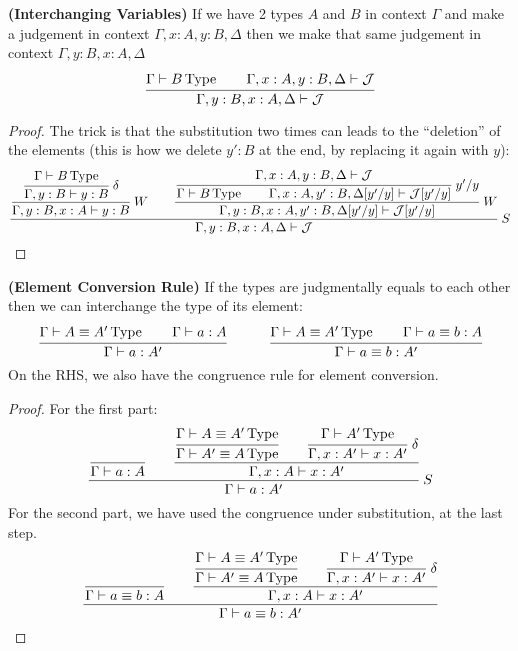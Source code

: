 \begin{lemma}{\textbf{(Interchanging Variables)}}
    If we have 2 types $A$ and $B$ in context $\Gamma$ and make a judgement in context $\Gamma,x:A,y:B,\Delta$ then we make that same judgement in context $\Gamma,y:B,x:A,\Delta$
    \begin{equation*}
        \cfrac{\Gamma\vdash B\operatorname{Type}  \qquad \Gamma,x:A,y:B,\Delta\vdash\mathcal{J}}{\Gamma,y:B,x:A,\Delta\vdash\mathcal{J}}
    \end{equation*}
\end{lemma}

\begin{proof}
    The trick is that the substitution two times can leads to the ``deletion'' of the elements (this is how we delete $y':B$ at the end, by replacing it again with $y$):
    \begin{equation*}
        \cfrac{\cfrac{\cfrac{\Gamma\vdash B\type }{\Gamma,y:B\vdash y:B}\ \delta}{\Gamma,y:B,x:A\vdash y:B} \ W \qquad\cfrac{\cfrac{\Gamma,x:A,y:B,\Delta\vdash\mathcal{J}}{\Gamma\vdash B\type \qquad\Gamma,x:A,y':B,\Delta[y'/y]\vdash\mathcal{J}[y'/y]}\ y'/y}{\Gamma,y:B,x:A,y':B,\Delta[y'/y]\vdash\mathcal{J}[y'/y]} \ W}{\Gamma,y:B,x:A,\Delta\vdash\mathcal{J}} \ S
    \end{equation*}
\end{proof}


\begin{lemma}{\textbf{(Element Conversion Rule)}}
    \label{lemma:element-conv-rule}
    If the types are judgmentally equals to each other then we can interchange the type of its element:
    \begin{equation*}
        \cfrac{\Gamma\vdash A\equiv A'\operatorname{Type} \qquad\Gamma\vdash a:A}{\Gamma\vdash a:A'} \qquad \quad \cfrac{\Gamma\vdash A\equiv A'\operatorname{Type}\qquad \Gamma\vdash a\equiv b:A}{\Gamma\vdash a\equiv b:A'}
    \end{equation*}
    On the RHS, we also have the congruence rule for element conversion.
\end{lemma}

\begin{proof}
    For the first part:
    \begin{equation*}
        \cfrac{\cfrac{}{\Gamma\vdash a:A}  \qquad \cfrac{\cfrac{\Gamma\vdash A\equiv A'\type }{\Gamma\vdash A'\equiv A\type }\qquad \cfrac{\Gamma\vdash A'\type }{\Gamma, x:A'\vdash x:A'}\ \delta}{\Gamma, x:A\vdash x:A'}}{\Gamma\vdash a:A'} \ S
    \end{equation*}
    For the second part, we have used the congruence under substitution, at the last step.
    \begin{equation*}
        \cfrac{\cfrac{}{\Gamma\vdash a\equiv b:A}\qquad \cfrac{\cfrac{\Gamma\vdash A\equiv A'\operatorname{Type}}{\Gamma\vdash A'\equiv A\operatorname{Type}}\qquad\cfrac{\Gamma\vdash A'\operatorname{Type}}{\Gamma, x:A'\vdash x:A'}\ \delta}{\Gamma,x:A\vdash x:A'}}{\Gamma\vdash a\equiv b:A'}
    \end{equation*}
\end{proof}



